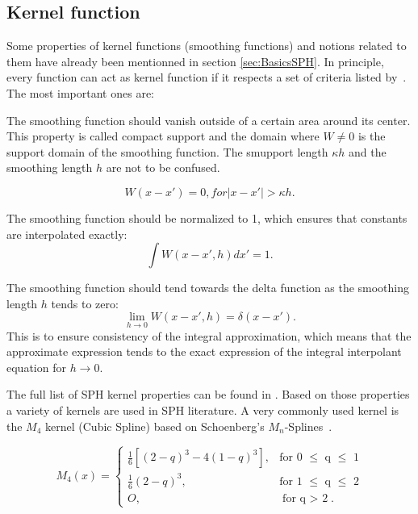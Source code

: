 \documentclass{report}
\begin{document}
\subsection{Kernel function}
\label{sec:KernelFunction}


Some properties of kernel functions (smoothing functions) and notions related
to them have already been mentionned in section
\ref{sec:BasicsSPH}. In principle, every function can act as kernel function
if it respects a set of criteria listed by~\cite{Liu2003}.
The most important ones are:

The smoothing function should vanish outside of a certain area around its
center. This property is called compact support and the domain where $W\neq0$
is the support domain of the smoothing function. The smupport length $\kappa h$ and the
smoothing length $h$ are not to be confused.
 
\begin{equation}
W(x-x')=0,\textit{for}|x-x'|>\kappa h.
\end{equation}

The smoothing function should be normalized to 1, which ensures that constants
are interpolated exactly:
\begin{equation}
\int{W(x-x',h)dx'}=1.
\end{equation}

The smoothing function should tend towards the delta function as the smoothing
length $h$ tends to zero:
\begin{equation}
\lim\limits_{h \rightarrow 0}{W(x-x',h)}=\delta(x-x').
\end{equation}
This is to ensure consistency of the integral approximation, which means that
the approximate expression tends to the exact expression of the integral
interpolant equation for $h \rightarrow 0$.

The full list of SPH kernel properties can be found in  \cite{Liu2003}.
Based on those properties a variety of kernels are used in SPH literature. A
very commonly used kernel is the $M_4$ kernel (Cubic Spline) based on Schoenberg's
$M_n$-Splines~\cite{Schoenberg1946}.

\begin{equation}
\label{eq:cubicSpline}
M_{4}(x)=\begin{cases}
\frac{1}{6}[(2-q)^{3}-4(1-q)^{3}],& \text{for 0 $\leq$ q $\leq$ 1} \\
\frac{1}{6}(2-q)^{3},&  \text{for 1 $\leq$ q $\leq$ 2} \\
O,& \text{for q $>$ 2}.
\end{cases}
\end{equation}
\end{document}
